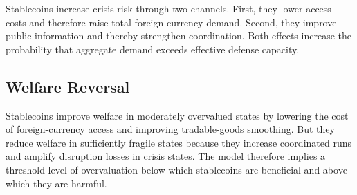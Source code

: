 Stablecoins increase crisis risk through two channels. First, they lower access costs and therefore raise total foreign-currency demand. Second, they improve public information and thereby strengthen coordination. Both effects increase the probability that aggregate demand exceeds effective defense capacity.

\subsection{Welfare Reversal}

Stablecoins improve welfare in moderately overvalued states by lowering the cost of foreign-currency access and improving tradable-goods smoothing. But they reduce welfare in sufficiently fragile states because they increase coordinated runs and amplify disruption losses in crisis states. The model therefore implies a threshold level of overvaluation below which stablecoins are beneficial and above which they are harmful.
